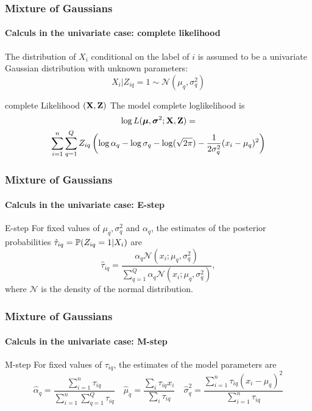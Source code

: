 \documentclass{beamer}\usepackage[]{graphicx}\usepackage[]{color}
\begin{document}
\begin{frame}
  \frametitle{Mixture of Gaussians}
  \framesubtitle{Calculs in the univariate case: complete likelihood}

  The distribution of $X_i$ conditional on the label of $i$ is assumed to be a univariate Gaussian distribution with unknown parameters:
  \begin{equation*}
  X_i | Z_{iq} = 1 \sim \mathcal{N}(\mu_q,\sigma^2_q)
  \end{equation*}

  \begin{block}{complete Likelihood $(\bX,\bZ)$}
  The model complete loglikelihood is
    \begin{multline*}
        \log L(\boldsymbol{\mu},\boldsymbol{\sigma}^2; \bX, \bZ)  = \\ \sum_{i=1}^n \sum_{q=1}^Q Z_{iq} \left(\log \alpha_q - \log\sigma_q -\log(\sqrt{2\pi}) - \frac{1}{2\sigma_q^2} (x_i - \mu_q)^2 \right)
   \end{multline*}
  \end{block}

\end{frame}

\begin{frame}
  \frametitle{Mixture of Gaussians}
  \framesubtitle{Calculs in the univariate case: E-step}

  \begin{block}{E-step}
    For fixed values of  $\mu_q, \sigma_q^2$ and  $\alpha_q$, the  estimates of  the
  posterior probabilities $\hat\tau_{iq}= \P(Z_{iq}=1|X_i)$ are
    \begin{equation*}
        \hat\tau_{iq} = \frac{\alpha_q \mathcal{N}(x_i; {\mu}_q, \sigma_q^2)}{\sum_{q=1}^Q \alpha_q \mathcal{N}(x_i; {\mu}_q, \sigma_q^2)},
   \end{equation*}
   where $\mathcal{N}$ is the density of the normal distribution.
  \end{block}

\end{frame}

\begin{frame}
  \frametitle{Mixture of Gaussians}
  \framesubtitle{Calculs in the univariate case: M-step}

  \begin{block}{M-step}
    For fixed values of  $\tau_{iq}$, the  estimates of  the model parameters are
    \begin{equation*}
    \hat\alpha_q = \frac{\sum_{i=1}^n \tau_{iq}}{\sum_{i=1}^n\sum_{q=1}^Q \tau_{iq}} \quad \hat\mu_q = \frac{\sum_i \tau_{iq} x_i}{\sum_i \tau_{iq}} \quad \hat\sigma^2_q = \frac{\sum_{i=1}^n \tau_{iq} (x_i-\mu_q)^2}{\sum_{i=1}^n \tau_{iq}}
   \end{equation*}
  \end{block}

\end{frame}
\end{document}
